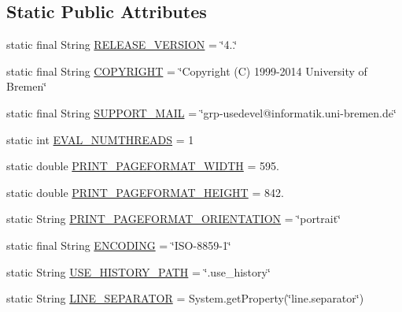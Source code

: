 \subsection*{Static Public Attributes}
\begin{DoxyCompactItemize}
\item 
static final String \hyperlink{classorg_1_1tzi_1_1use_1_1config_1_1_options_af30b97b29a5b57472bf05d6c91a9ae5e}{R\-E\-L\-E\-A\-S\-E\-\_\-\-V\-E\-R\-S\-I\-O\-N} = \char`\"{}4..\char`\"{}
\item 
static final String \hyperlink{classorg_1_1tzi_1_1use_1_1config_1_1_options_ad8fe85cb4748a041701dce3bcb988564}{C\-O\-P\-Y\-R\-I\-G\-H\-T} = \char`\"{}Copyright (C) 1999-\/2014 University of Bremen\char`\"{}
\item 
static final String \hyperlink{classorg_1_1tzi_1_1use_1_1config_1_1_options_a9802ac86d23221159c639062f27fdc18}{S\-U\-P\-P\-O\-R\-T\-\_\-\-M\-A\-I\-L} = \char`\"{}grp-\/usedevel@informatik.\-uni-\/bremen.\-de\char`\"{}
\item 
static int \hyperlink{classorg_1_1tzi_1_1use_1_1config_1_1_options_a32a63c54041582a986ef1834ffa66c5a}{E\-V\-A\-L\-\_\-\-N\-U\-M\-T\-H\-R\-E\-A\-D\-S} = 1
\item 
static double \hyperlink{classorg_1_1tzi_1_1use_1_1config_1_1_options_a75899fd6b68a84ea0bc197408a3841af}{P\-R\-I\-N\-T\-\_\-\-P\-A\-G\-E\-F\-O\-R\-M\-A\-T\-\_\-\-W\-I\-D\-T\-H} = 595.
\item 
static double \hyperlink{classorg_1_1tzi_1_1use_1_1config_1_1_options_af6041591d2c714dfb43daebc173e58f4}{P\-R\-I\-N\-T\-\_\-\-P\-A\-G\-E\-F\-O\-R\-M\-A\-T\-\_\-\-H\-E\-I\-G\-H\-T} = 842.
\item 
static String \hyperlink{classorg_1_1tzi_1_1use_1_1config_1_1_options_a30663101c78b7481fd656d0c87e1aa72}{P\-R\-I\-N\-T\-\_\-\-P\-A\-G\-E\-F\-O\-R\-M\-A\-T\-\_\-\-O\-R\-I\-E\-N\-T\-A\-T\-I\-O\-N} = \char`\"{}portrait\char`\"{}
\item 
static final String \hyperlink{classorg_1_1tzi_1_1use_1_1config_1_1_options_aa4d8c50f686c77078a30b5f3c1a77600}{E\-N\-C\-O\-D\-I\-N\-G} = \char`\"{}I\-S\-O-\/8859-\/1\char`\"{}
\item 
static String \hyperlink{classorg_1_1tzi_1_1use_1_1config_1_1_options_a18cd55fcda03ba0c2c036a7e9d186408}{U\-S\-E\-\_\-\-H\-I\-S\-T\-O\-R\-Y\-\_\-\-P\-A\-T\-H} = \char`\"{}.use\-\_\-history\char`\"{}
\item 
static String \hyperlink{classorg_1_1tzi_1_1use_1_1config_1_1_options_a868d2a008af86654a1a01f88cc5df9ca}{L\-I\-N\-E\-\_\-\-S\-E\-P\-A\-R\-A\-T\-O\-R} = System.\-get\-Property(\char`\"{}line.\-separator\char`\"{})

\end{DoxyCompactItemize}
